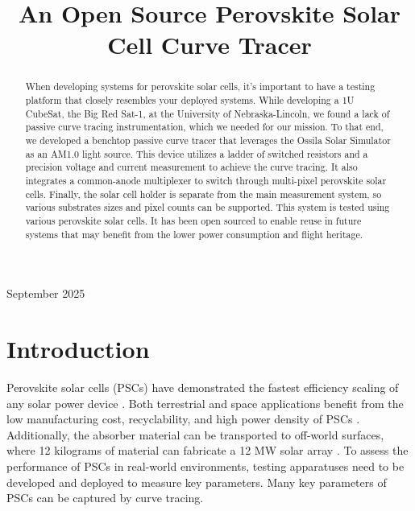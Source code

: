 \documentclass[12pt]{iopart}
\begin{document}
\title[An Open Source Perovskite Solar Cell Curve Tracer]{An Open Source Perovskite Solar Cell Curve Tracer}


\begin{indented}
\item[]September 2025
\end{indented}

\begin{abstract}
When developing systems for perovskite solar cells, it's important to have a testing platform that closely resembles your deployed systems.  While developing a 1U CubeSat, the Big Red Sat-1, at the University of Nebraska-Lincoln, we found a lack of passive curve tracing instrumentation, which we needed for our mission.  To that end, we developed a benchtop passive curve tracer that leverages the Ossila Solar Simulator as an AM1.0 light source.  This device utilizes a ladder of switched resistors and a precision voltage and current measurement to achieve the curve tracing.  It also integrates a common-anode multiplexer to switch through multi-pixel perovskite solar cells.  Finally, the solar cell holder is separate from the main measurement system, so various substrates sizes and pixel counts can be supported.  This system is tested using various perovskite solar cells.  It has been open sourced to enable reuse in future systems that may benefit from the lower power consumption and flight heritage.
\end{abstract}

\section*{Introduction}

Perovskite solar cells (PSCs) have demonstrated the fastest efficiency scaling of any solar power device \cite{velilla2019outdoor}.  Both terrestrial and space applications benefit from the low manufacturing cost, recyclability, and high power density of PSCs \cite{kirmani2023metal, mcmillon2022would}.  Additionally, the absorber material can be transported to off-world surfaces, where 12 kilograms of material can fabricate a 12 MW solar array \cite{mcmillon2022would}.  To assess the performance of PSCs in real-world environments, testing apparatuses need to be developed and deployed to measure key parameters.  Many key parameters of PSCs can be captured by curve tracing.
\end{document}
